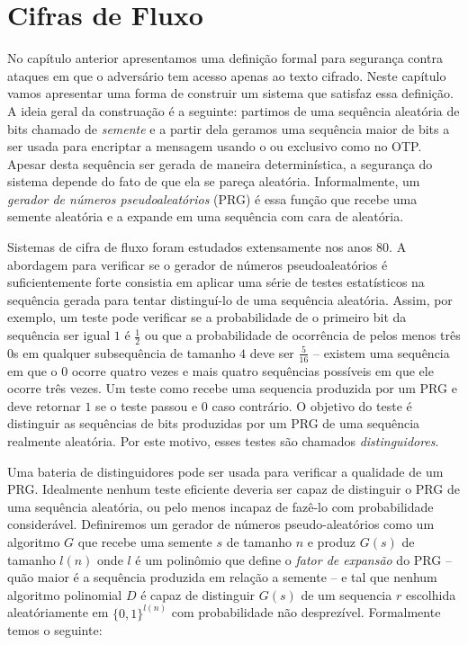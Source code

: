 \chapter{Cifras de Fluxo}
\label{cha:cifras-de-fluxo}

No capítulo anterior apresentamos uma definição formal para segurança contra ataques em que o adversário tem acesso apenas ao texto cifrado.
Neste capítulo vamos apresentar uma forma de construir um sistema que satisfaz essa definição.
A ideia geral da construação é a seguinte: partimos de uma sequência aleatória de bits chamado de {\em semente} e a partir dela geramos uma sequência maior de bits a ser usada para encriptar a mensagem usando o ou exclusivo como no OTP.
Apesar desta sequência ser gerada de maneira determinística, a segurança do sistema depende do fato de que ela se pareça aleatória.
Informalmente, um {\em gerador de números pseudoaleatórios} (PRG) é essa função que recebe uma semente aleatória e a expande em uma sequência com cara de aleatória.

Sistemas de cifra de fluxo foram estudados extensamente nos anos 80.
A abordagem para verificar se o gerador de números pseudoaleatórios é suficientemente forte consistia em aplicar uma série de testes estatísticos na sequência gerada para tentar distinguí-lo de uma sequência aleatória.
Assim, por exemplo, um teste pode verificar se a probabilidade de o primeiro bit da sequência ser igual $1$ é $\frac{1}{2}$ ou que a probabilidade de ocorrência de pelos menos três $0$s em qualquer subsequência de tamanho $4$ deve ser $\frac{5}{16}$ -- existem uma sequência em que o $0$ ocorre quatro vezes e mais quatro sequências possíveis em que ele ocorre três vezes.
Um teste como recebe uma sequencia produzida por um PRG e deve retornar $1$ se o teste passou e $0$ caso contrário.
O objetivo do teste é distinguir as sequências de bits produzidas por um PRG de uma sequência realmente aleatória.
Por este motivo, esses testes são chamados {\em distinguidores}.

Uma bateria de distinguidores pode ser usada para verificar a qualidade de um PRG.
Idealmente nenhum teste eficiente deveria ser capaz de distinguir o PRG de uma sequência aleatória, ou pelo menos incapaz de fazê-lo com probabilidade considerável.
Definiremos um gerador de números pseudo-aleatórios como um algoritmo $G$ que recebe uma semente $s$ de tamanho $n$ e produz $G(s)$ de tamanho $l(n)$ onde $l$ é um polinômio que define o {\em fator de expansão} do PRG -- quão maior é a sequência produzida em relação a semente -- e tal que nenhum algoritmo polinomial $D$ é capaz de distinguir $G(s)$ de um sequencia $r$ escolhida aleatóriamente em $\{0,1\}^{l(n)}$ com probabilidade não desprezível.
Formalmente temos o seguinte:



